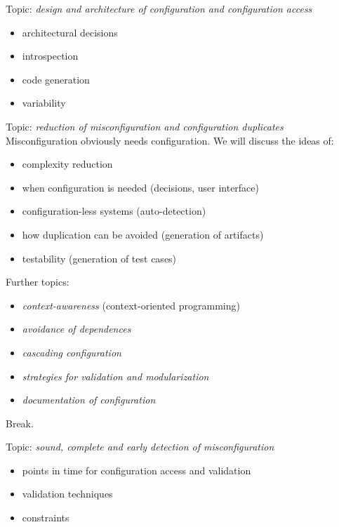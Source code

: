 \documentclass{beamer}
\begin{document}
\begin{frame}
	Topic: \textit{design and architecture of configuration and configuration access}
	\begin{itemize}
		\item architectural decisions
		\item introspection
		\item code generation
		\item variability
	\end{itemize}
\end{frame}

\begin{frame}
	Topic: \textit{reduction of misconfiguration and configuration duplicates} \\
	Misconfiguration obviously needs configuration.
	We will discuss the ideas of:
	\begin{itemize}
		\item complexity reduction
		\item when configuration is needed (decisions, user interface)
		\item configuration-less systems (auto-detection)
		\item how duplication can be avoided (generation of artifacts)
		\item testability (generation of test cases)
	\end{itemize}
\end{frame}

\begin{frame}
	Further topics:
	\begin{itemize}
		\item \textit{context-awareness} (context-oriented programming)
		\item \textit{avoidance of dependences}
		\item \textit{cascading configuration}
		\item \textit{strategies for validation and modularization}
		\item \textit{documentation of configuration}
	\end{itemize}
\end{frame}

\begin{assignment}
	\begin{task}
	Break.
	\end{task}
\end{assignment}

\begin{frame}
	Topic: \textit{sound, complete and early detection of misconfiguration}
	\begin{itemize}
		\item points in time for configuration access and validation
		\item validation techniques
		\item constraints
	\end{itemize}
\end{frame}
\end{document}

